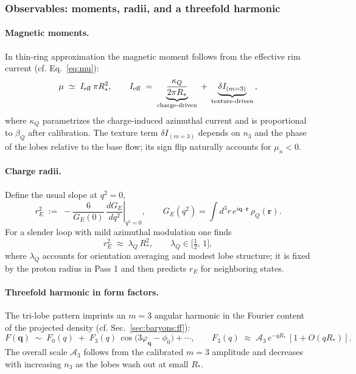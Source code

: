 \subsubsection{Observables: moments, radii, and a threefold harmonic}
\label{sec:baryons-phenomenology:observables}

\paragraph{Magnetic moments.}
In thin-ring approximation the magnetic moment follows from the effective rim current (cf. Eq.~\eqref{eq:mu}):
\begin{equation}
\mu \;\simeq\; I_{\rm eff}\,\pi R_\ast^2,
\qquad
I_{\rm eff}\;=\; \underbrace{\frac{\kappa_Q}{2\pi R_\ast}}_{\text{charge-driven}} \;+\; \underbrace{\delta I_{(m=3)}}_{\text{texture-driven}}\,,
\label{eq:mu-predict}
\end{equation}
where $\kappa_Q$ parametrizes the charge-induced azimuthal current and is proportional to $\beta_Q$ after calibration. The texture term $\delta I_{(m=3)}$ depends on $n_3$ and the phase of the lobes relative to the base flow; its sign flip naturally accounts for $\mu_n<0$.

\paragraph{Charge radii.}
Define the usual slope at $q^2\!=\!0$,
\begin{equation}
r_E^2 \;:=\; -\frac{6}{G_E(0)}\,\left.\frac{dG_E}{dq^2}\right|_{q^2=0},\qquad
G_E(q^2)=\int d^3r\,e^{i\mathbf q\cdot\mathbf r}\,\rho_Q(\mathbf r).
\label{eq:rE-def}
\end{equation}
For a slender loop with mild azimuthal modulation one finds
\begin{equation}
r_E^2 \;\approx\; \lambda_Q\,R_\ast^2,\qquad \lambda_Q\in\Big[\tfrac{1}{2},\,1\Big],
\label{eq:rE-approx}
\end{equation}
where $\lambda_Q$ accounts for orientation averaging and modest lobe structure; it is fixed by the proton radius in Pass 1 and then predicts $r_E$ for neighboring states.

\paragraph{Threefold harmonic in form factors.}
The tri-lobe pattern imprints an $m{=}3$ angular harmonic in the Fourier content of the projected density (cf. Sec.~\ref{sec:baryons:ff}):
\begin{equation}
F(\mathbf q)\;\sim\;F_0(q)\;+\;F_3(q)\,\cos\!\big(3\varphi_{\mathbf q}-\phi_0\big)+\cdots,
\qquad
F_3(q)\;\approx\;\mathcal A_3\,e^{-qR_\ast}\,[1+O(qR_\ast)].
\label{eq:F3}
\end{equation}
The overall scale $\mathcal A_3$ follows from the calibrated $m{=}3$ amplitude and decreases with increasing $n_3$ as the lobes wash out at small $R_\ast$.

